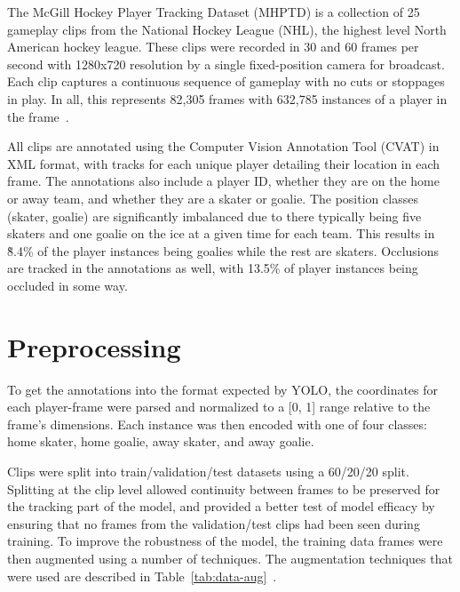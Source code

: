 \documentclass[12pt,stu,donotrepeattitle,floatsintext]{apa7}
\newcommand{\customsection}[2]{
  \phantomsection
  \section*{#1}\label{#2}
  \addcontentsline{toc}{section}{#1}
}
\begin{document}
    The McGill Hockey Player Tracking Dataset (MHPTD) is a collection of 25 gameplay clips from the National Hockey League (NHL), the highest level North American hockey league.
    These clips were recorded in 30 and 60 frames per second with 1280x720 resolution by a single fixed-position camera for broadcast.
    Each clip captures a continuous sequence of gameplay with no cuts or stoppages in play.
    In all, this represents 82,305 frames with 632,785 instances of a player in the frame~\parencite{mhptd}.

    All clips are annotated using the Computer Vision Annotation Tool (CVAT) in XML format, with tracks for each unique player detailing their location in each frame.
    The annotations also include a player ID, whether they are on the home or away team, and whether they are a skater or goalie.
    The position classes (skater, goalie) are significantly imbalanced due to there typically being five skaters and one goalie on the ice at a given time for each team.
    This results in \~8.4\% of the player instances being goalies while the rest are skaters.
    Occlusions are tracked in the annotations as well, with 13.5\% of player instances being occluded in some way.

    \customsection{Preprocessing}{preprocessing}

    To get the annotations into the format expected by YOLO, the coordinates for each player-frame were parsed and normalized to a [0, 1] range relative to the frame's dimensions.
    Each instance was then encoded with one of four classes: home skater, home goalie, away skater, and away goalie.

    Clips were split into train/validation/test datasets using a 60/20/20 split.
    Splitting at the clip level allowed continuity between frames to be preserved for the tracking part of the model, and provided a better test of model efficacy by ensuring that no frames from the validation/test clips had been seen during training.
    To improve the robustness of the model, the training data frames were then augmented using a number of techniques.
    The augmentation techniques that were used are described in Table~\ref{tab:data-aug}~\parencite{yolo_train_docs}.
\end{document}
